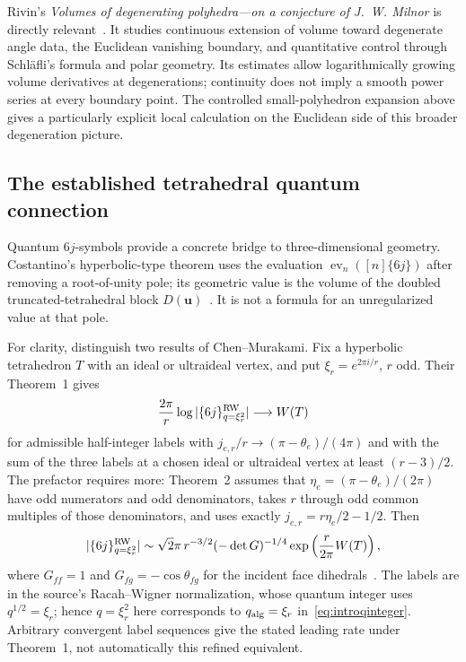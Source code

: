 Rivin's \emph{Volumes of degenerating polyhedra---on a conjecture
of J.~W. Milnor} is directly relevant~\cite{RivinDegeneration}.
It studies continuous extension of volume toward degenerate angle
data, the Euclidean vanishing boundary, and quantitative control
through Schl\"afli's formula and polar geometry. Its estimates
allow logarithmically growing volume derivatives at degenerations;
continuity does not imply a smooth power series at every boundary
point. The controlled small-polyhedron expansion above gives a
particularly explicit local calculation on the Euclidean side of
this broader degeneration picture.

\subsection{The established tetrahedral quantum connection}

Quantum $6j$-symbols provide a concrete bridge to three-dimensional
geometry. Costantino's hyperbolic-type theorem uses the evaluation
$\operatorname{ev}_n([n]\{6j\})$ after removing a root-of-unity pole;
its geometric value is the volume of the doubled truncated-tetrahedral
block $D(\boldsymbol u)$~\cite[Definitions~3.1--3.2 and Theorem~3.9]{Costantino}.
It is not a formula for an unregularized value at that pole.

For clarity, distinguish two results of Chen--Murakami. Fix a
hyperbolic tetrahedron $T$ with an ideal or ultraideal vertex,
and put $\xi_r=e^{2\pi i/r}$, $r$ odd. Their Theorem~1 gives
\[
 \frac{2\pi}{r}\log|\{6j\}^{\rm RW}_{q=\xi_r^2}|
       \longrightarrow W(T)
\]
for admissible half-integer labels with
$j_{e,r}/r\to(\pi-\theta_e)/(4\pi)$ and with the sum of the
three labels at a chosen ideal or ultraideal vertex at least
$(r-3)/2$. The prefactor requires more: Theorem~2 assumes that
$\eta_e=(\pi-\theta_e)/(2\pi)$ have odd numerators and odd
denominators, takes $r$ through odd common multiples of those
denominators, and uses exactly $j_{e,r}=r\eta_e/2-1/2$. Then
\begin{equation}
 |\{6j\}^{\rm RW}_{q=\xi_r^2}|\sim
 \sqrt2\pi\,r^{-3/2}(-\det G)^{-1/4}
                 \exp\left(\frac{r}{2\pi}W(T)\right),
 \label{eq:quantum6jstructure}
\end{equation}
where $G_{ff}=1$ and $G_{fg}=-\cos\theta_{fg}$ for the incident
face dihedrals~\cite[Theorems~1--2, pp.~1--2]{ChenMurakami}.
The labels are in the source's Racah--Wigner normalization, whose
quantum integer uses $q^{1/2}=\xi_r$; hence $q=\xi_r^2$ here corresponds
to $q_{\rm alg}=\xi_r$ in~\eqref{eq:introqinteger}. Arbitrary
convergent label sequences give the stated leading rate under
Theorem~1, not automatically this refined equivalent.

